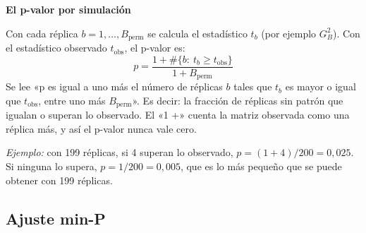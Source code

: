 \documentclass[11pt,a4paper]{article}
\newcommand{\cajainicio}[3]{\par\medskip\noindent
  \begin{lrbox}{\cajabox}\begin{minipage}{\dimexpr\linewidth-2\fboxsep-2\fboxrule\relax}%
  \textbf{\color{#1}#3}\par\smallskip}
\newcommand{\cajafin}[2]{\end{minipage}\end{lrbox}\fcolorbox{#1}{#2}{\usebox{\cajabox}}\par\medskip}
\newenvironment{nota}[1]{\cajainicio{acc}{acc!7}{#1}}{\cajafin{acc}{acc!7}}
\begin{document}
\begin{nota}{El p-valor por simulación}
Con cada réplica $b=1,\dots,B_{\mathrm{perm}}$ se calcula el estadístico $t_b$ (por ejemplo $G^2_B$). Con el estadístico observado $t_{\mathrm{obs}}$, el p-valor es:
\[ p=\frac{1+\#\{b:\ t_b\ge t_{\mathrm{obs}}\}}{1+B_{\mathrm{perm}}} \]
Se lee «p es igual a uno más el número de réplicas $b$ tales que $t_b$ es mayor o igual que $t_{\mathrm{obs}}$, entre uno más $B_{\mathrm{perm}}$». Es decir: la fracción de réplicas sin patrón que igualan o superan lo observado. El «1 +» cuenta la matriz observada como una réplica más, y así el p-valor nunca vale cero.

\textit{Ejemplo:} con 199 réplicas, si 4 superan lo observado, $p=(1+4)/200=0{,}025$. Si ninguna lo supera, $p=1/200=0{,}005$, que es lo más pequeño que se puede obtener con 199 réplicas.
\end{nota}

\subsection*{Ajuste min-P}
\end{document}
